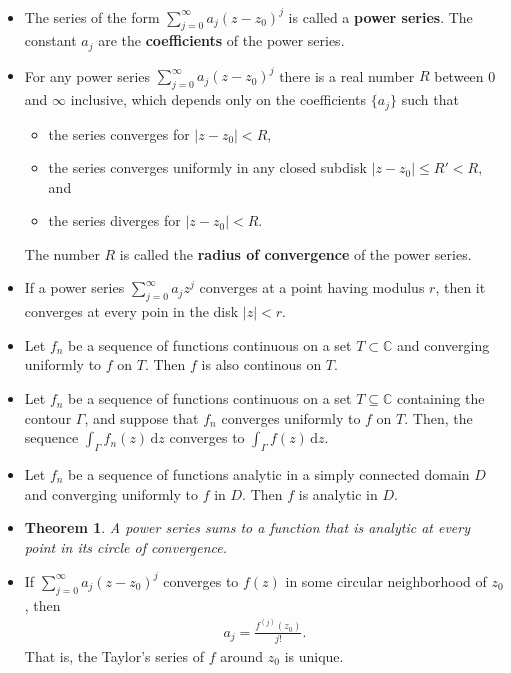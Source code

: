 \documentclass[10pt]{article}
\newtheorem{theorem}[lemma]{Theorem}
\newcommand{\dee}{\mathrm{d}}
\begin{document}
\begin{itemize}
    \item The series of the form $\sum_{j=0}^\infty a_j(z-z_0)^j$ is called a {\bf power series}. The constant $a_j$ are the {\bf coefficients} of the power series.

    \item For any power series $\sum_{j=0}^\infty a_j(z-z_0)^j$ there is a real number $R$ between 0 and $\infty$ inclusive, which depends only on the coefficients $\{ a_j \}$ such that
    \begin{itemize}
      \item the series converges for $|z-z_0| < R$,
      \item the series converges uniformly in any closed subdisk $|z-z_0| \leq R' < R,$ and
      \item the series diverges for $|z-z_0| < R$.
    \end{itemize}
    The number $R$ is called the {\bf radius of convergence} of the power series.

    \item If a power series $\sum_{j=0}^\infty a_j z^j$ converges at a point having modulus $r$, then it converges at every poin in the disk $|z| < r$.
    
    \item Let $f_n$ be a sequence of functions continuous on a set $T \subset \mathbb{C}$ and converging uniformly to $f$ on $T$. Then $f$ is also continous on $T$.

    \item Let $f_n$ be a sequence of functions continuous on a set $T \subseteq \mathbb{C}$ containing the contour $\Gamma$, and suppose that $f_n$ converges uniformly to $f$ on $T$. Then, the sequence $\int_\Gamma f_n(z)\, \dee z$ converges to $\int_\Gamma f(z)\, \dee z$.

    \item Let $f_n$ be a sequence of functions analytic in a simply connected domain $D$ and converging uniformly to $f$ in $D$. Then $f$ is analytic in $D$.

    \item \begin{theorem}
      A power series sums to a function that is analytic at every point in its circle of convergence.
    \end{theorem}

    \item If $\sum_{j=0}^\infty a_j(z-z_0)^j$ converges to $f(z)$ in some circular neighborhood of $z_0$, then
    \begin{align*}
      a_j = \frac{f^{(j)}(z_0)}{j!}.
    \end{align*}
    That is, the Taylor's series of $f$ around $z_0$ is unique.


\end{itemize}
\end{document}
